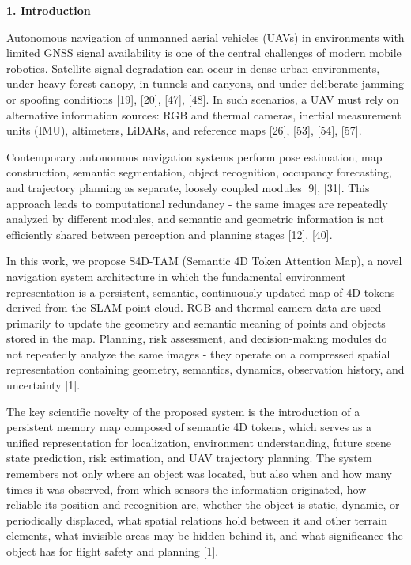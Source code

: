 \documentclass[
]{article}
\begin{document}
\textbf{1. Introduction}

Autonomous navigation of unmanned aerial vehicles (UAVs) in environments
with limited GNSS signal availability is one of the central challenges
of modern mobile robotics. Satellite signal degradation can occur in
dense urban environments, under heavy forest canopy, in tunnels and
canyons, and under deliberate jamming or spoofing conditions {[}19{]},
{[}20{]}, {[}47{]}, {[}48{]}. In such scenarios, a UAV must rely on
alternative information sources: RGB and thermal cameras, inertial
measurement units (IMU), altimeters, LiDARs, and reference maps
{[}26{]}, {[}53{]}, {[}54{]}, {[}57{]}.

Contemporary autonomous navigation systems perform pose estimation, map
construction, semantic segmentation, object recognition, occupancy
forecasting, and trajectory planning as separate, loosely coupled
modules {[}9{]}, {[}31{]}. This approach leads to computational
redundancy - the same images are repeatedly analyzed by different
modules, and semantic and geometric information is not efficiently
shared between perception and planning stages {[}12{]}, {[}40{]}.

In this work, we propose S4D-TAM (Semantic 4D Token Attention Map), a
novel navigation system architecture in which the fundamental
environment representation is a persistent, semantic, continuously
updated map of 4D tokens derived from the SLAM point cloud. RGB and
thermal camera data are used primarily to update the geometry and
semantic meaning of points and objects stored in the map. Planning, risk
assessment, and decision-making modules do not repeatedly analyze the
same images - they operate on a compressed spatial representation
containing geometry, semantics, dynamics, observation history, and
uncertainty {[}1{]}.

The key scientific novelty of the proposed system is the introduction of
a persistent memory map composed of semantic 4D tokens, which serves as
a unified representation for localization, environment understanding,
future scene state prediction, risk estimation, and UAV trajectory
planning. The system remembers not only where an object was located, but
also when and how many times it was observed, from which sensors the
information originated, how reliable its position and recognition are,
whether the object is static, dynamic, or periodically displaced, what
spatial relations hold between it and other terrain elements, what
invisible areas may be hidden behind it, and what significance the
object has for flight safety and planning {[}1{]}.
\end{document}
